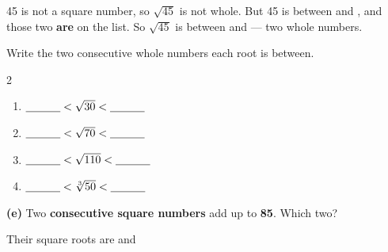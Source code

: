 \documentclass[12pt,a4paper]{article}
\begin{document}

\begin{yourturn}
  45 is not a square number, so $\sqrt{45}$ is not whole. But 45 is between
   and , and those two \textbf{are} on the list. So $\sqrt{45}$ is
  between  and  --- two  whole numbers.
\end{yourturn}

\noindent Write the two consecutive whole numbers each root is between.

\vspace{8pt}
\begin{multicols}{2}
\begin{enumerate}[label=(\alph*), itemsep=11pt]
  \item $\blank[1.1cm] < \sqrt{30} < \blank[1.1cm]$
  \item $\blank[1.1cm] < \sqrt{70} < \blank[1.1cm]$
  \item $\blank[1.1cm] < \sqrt{110} < \blank[1.1cm]$
  \item $\blank[1.1cm] < \sqrt[3]{50} < \blank[1.1cm]$
\end{enumerate}
\end{multicols}

\vspace{8pt}
\noindent\textbf{(e)} Two \textbf{consecutive square numbers} add up to \textbf{85}.
Which two? \blank[4.6cm]

\vspace{6pt}
\noindent\hspace*{1em}Their square roots are \blank[1.6cm] and \blank[1.6cm]

\end{document}

